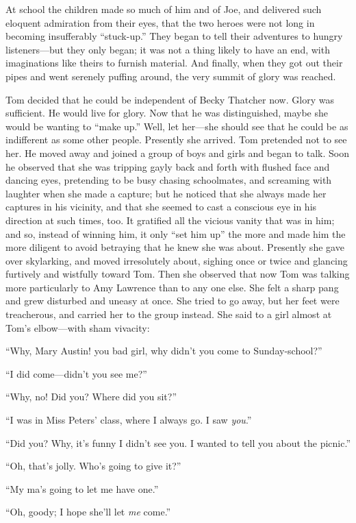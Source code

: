 \documentclass{book}
\begin{document}
At school the children made so much of him and of Joe, and delivered such eloquent admiration from their eyes, that the two heroes were not long in becoming insufferably “stuck-up.” They began to tell their adventures to hungry listeners—but they only began; it was not a thing likely to have an end, with imaginations like theirs to furnish material. And finally, when they got out their pipes and went serenely puffing around, the very summit of glory was reached.

Tom decided that he could be independent of Becky Thatcher now. Glory was sufficient. He would live for glory. Now that he was distinguished, maybe she would be wanting to “make up.” Well, let her—she should see that he could be as indifferent as some other people. Presently she arrived. Tom pretended not to see her. He moved away and joined a group of boys and girls and began to talk. Soon he observed that she was tripping gayly back and forth with flushed face and dancing eyes, pretending to be busy chasing schoolmates, and screaming with laughter when she made a capture; but he noticed that she always made her captures in his vicinity, and that she seemed to cast a conscious eye in his direction at such times, too. It gratified all the vicious vanity that was in him; and so, instead of winning him, it only “set him up” the more and made him the more diligent to avoid betraying that he knew she was about. Presently she gave over skylarking, and moved irresolutely about, sighing once or twice and glancing furtively and wistfully toward Tom. Then she observed that now Tom was talking more particularly to Amy Lawrence than to any one else. She felt a sharp pang and grew disturbed and uneasy at once. She tried to go away, but her feet were treacherous, and carried her to the group instead. She said to a girl almost at Tom’s elbow—with sham vivacity:

“Why, Mary Austin! you bad girl, why didn’t you come to Sunday-school?”

“I did come—didn’t you see me?”

“Why, no! Did you? Where did you sit?”

“I was in Miss Peters’ class, where I always go. I saw \emph{you}.”

“Did you? Why, it’s funny I didn’t see you. I wanted to tell you about the picnic.”

“Oh, that’s jolly. Who’s going to give it?”

“My ma’s going to let me have one.”

“Oh, goody; I hope she’ll let \emph{me} come.”
\end{document}
